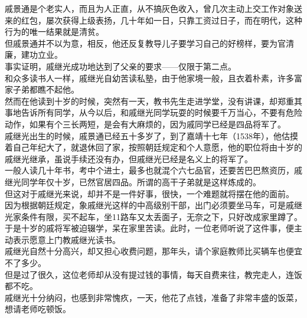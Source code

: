 \begin{multicols}{\theparacolNo}
戚景通是个老实人，而且为人正直，从不搞灰色收入，曾几次主动上交工作对象送来的红包，屡次获得上级表扬，几十年如一日，只靠工资过日子，而在明代，这种行为的唯一结果就是清贫。\\

但戚景通并不以为意，相反，他还反复教导儿子要学习自己的好榜样，要为官清廉，建功立业。\\

事实证明，戚继光成功地达到了父亲的要求——仅限于第二点。\\

和众多读书人一样，戚继光自幼苦读私塾，由于他家境一般，且衣着朴素，许多富家子弟都瞧不起他。\\

然而在他读到十岁的时候，突然有一天，教书先生走进学堂，没有讲课，却郑重其事地告诉所有同学，从今以后，和戚继光同学玩耍的时候要千万当心，不要有危险动作，如果有个三长两短，是会有大麻烦的，因为戚同学已经是四品将军了。\\

戚继光出生的时候，戚景通已经五十多岁了，到了嘉靖十七年（1538年），他估摸着自己年纪大了，就退休回了家，按照朝廷规定和个人意愿，他的职位将由十岁的戚继光继承，虽说手续还没有办，但戚继光已经是名义上的将军了。\\

一般人读几十年书，考中个进士，最多也就混个六七品官，还要苦巴巴熬资历，戚继光同学年仅十岁，已然官居四品。所谓的高干子弟就是这样炼成的。\\

但这对于戚继光来说，却并不是一件好事，很快，一个难题就将摆在他的面前。\\

因为根据朝廷规定，象戚继光这样的中高级别干部，出门必须要坐马车，可是戚继光家条件有限，买不起车，坐11路车又太丢面子，无奈之下，只好改成家里蹲了。\\

于是十岁的戚将军被迫辍学，呆在家里苦读。此时，一位老师听说了这件事，便主动表示愿意上门教戚继光读书。\\

戚继光自然十分高兴，却又担心收费问题，那年头，请个家庭教师比买辆车也便宜不了多少。\\

但是过了很久，这位老师却从没有提过钱的事情，每天自费来往，教完走人，连饭都不吃。\\

戚继光十分纳闷，也感到非常愧疚，一天，他花了点钱，准备了非常丰盛的饭菜，想请老师吃顿饭。\\


\end{multicols}
